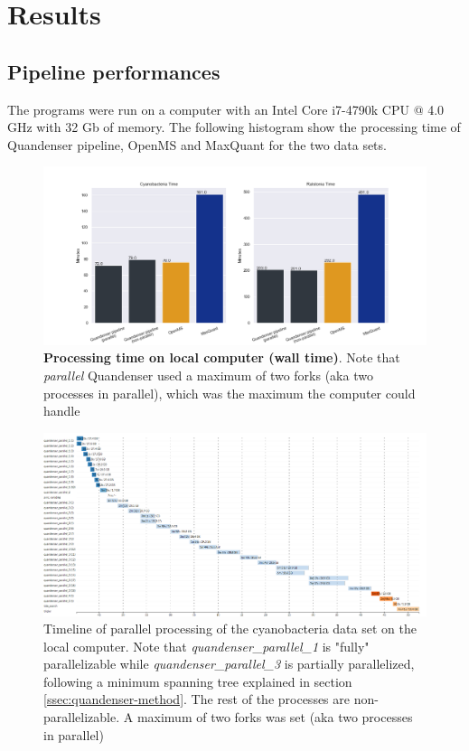 \section{Results}

\subsection{Pipeline performances}

The programs were run on a computer with an Intel Core i7-4790k CPU @ 4.0 GHz with 32 Gb of memory. The following histogram show the processing time of Quandenser pipeline, OpenMS and MaxQuant for the two data sets.

\begin{figure}[H]  %
  \includegraphics[width=\linewidth]{results/times.png}
  \caption{\textbf{Processing time on local computer (wall time)}. Note that \textit{parallel} Quandenser used a maximum of two forks (aka two processes in parallel), which was the maximum the computer could handle}
  \label{fig:processing-local}
\end{figure}

\begin{figure}[H]
  \includegraphics[width=\linewidth]{results/timeline-local.png}
  \caption{Timeline of parallel processing of the cyanobacteria data set on the local computer. Note that \textit{quandenser\_parallel\_1} is "fully" parallelizable while \textit{quandenser\_parallel\_3} is partially parallelized, following a minimum spanning tree explained in section \ref{ssec:quandenser-method}. The rest of the processes are non-parallelizable. A maximum of two forks was set (aka two processes in parallel)}
  \label{fig:timeline-local}
\end{figure}

